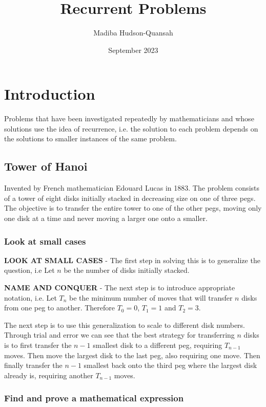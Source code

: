 \documentclass[12pt letter]{report}
\title{\Huge{Recurrent Problems}}
\author{\huge{Madiba Hudson-Quansah}}
\date{September 2023}
\begin{document}
\maketitle
\newpage
{}
\tableofcontents
\pagebreak

\chapter{Introduction}

Problems that have been investigated repeatedly by mathematicians and whose solutions use the idea of recurrence, i.e.
the solution to each problem depends on the solutions to smaller instances of the same problem.

\section{Tower of Hanoi}

Invented by French mathematician Edouard Lucas in 1883. The problem consists of a tower of eight disks initially stacked
in decreasing size on one of three pegs.
The objective is to transfer the entire tower to one of the other pegs, moving only one disk at a time and never moving
a larger one onto a smaller.

\subsection{Look at small cases}\label{small}

\textbf{LOOK AT SMALL CASES} - The first step in solving this is to generalize the question, i.e Let $n$ be the number of disks initially stacked.

\textbf{NAME AND CONQUER} - The next step is to introduce appropriate notation, i.e. Let $T_n$ be the minimum number of moves that will transfer $n$
disks from one peg to another. Therefore $T_0 = 0$, $T_1= 1$ and $T_2 = 3$.

The next step is to use this generalization to scale to different disk numbers. Through trial and error we can see that
the best strategy for transferring $n$ disks is to first transfer the $n - 1$ smallest disk to a different peg, requiring
$T_{n-1}$ moves. Then move the largest disk to the last peg, also requiring one move. Then finally transfer the $n-1$
smallest back onto the third peg where the largest disk already is, requiring another $T_{n-1}$ moves.

\subsection{Find and prove a mathematical expression}\label{expression}
\end{document}
